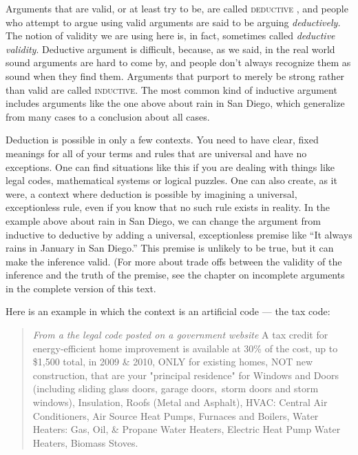 Arguments that are valid, or at least try to be, are called \textsc{\gls{deductive}} \label{def:deductive}, and people who attempt to argue using valid arguments are said to be arguing \textit{deductively.} The notion of validity we are using here is, in fact, sometimes called \textit{deductive validity}. Deductive argument is difficult, because, as we said, in the real world sound arguments are hard to come by, and people don't always recognize them as sound when they find them. Arguments that purport to merely be strong rather than valid are called \textsc{\gls{inductive}}. \label{def:inductive} The most common kind of inductive argument includes arguments like the one above about rain in San Diego, which generalize from many cases to a conclusion about all cases.

Deduction is possible in only a few contexts. You need to have clear, fixed meanings for all of your terms and rules that are universal and have no exceptions.   One can find situations like this if you are dealing with things like legal codes, mathematical systems or logical puzzles. One can also create, as it were, a context where deduction is possible by imagining a universal, exceptionless rule, even if you know that no such rule exists in reality. In the example above about rain in San Diego, we can change the argument from inductive to deductive by adding a universal, exceptionless premise like ``It always rains in January in San Diego.'' This premise is unlikely to be true, but it can make the inference valid. (For more about trade offs between the validity of the inference and the truth of the premise, see the chapter on incomplete arguments in the complete version of this text. \label{ver_var} 

Here is an example in which the context is an artificial code --- the tax code: 

\begin{quotation} \noindent\textit{From a the legal code posted on a government website} A tax credit for energy-efficient home improvement is available at 30\% of the cost, up to \$1,500 total, in 2009 \& 2010, ONLY for existing homes, NOT new construction, that are your "principal residence" for Windows and Doors (including sliding glass doors, garage doors,~storm doors and storm windows), Insulation, Roofs (Metal and Asphalt), HVAC: Central Air Conditioners, Air Source Heat Pumps, Furnaces and Boilers, Water Heaters: Gas, Oil, \& Propane Water Heaters, Electric Heat Pump Water Heaters, Biomass Stoves. \end{quotation}

